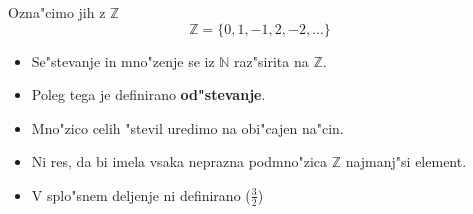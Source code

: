 Ozna"cimo jih z \(\mathbb{Z} \)
\[\mathbb{Z} = \{0, 1, -1, 2, -2, ...\} \]

\begin{itemize}
	\item Se"stevanje in mno"zenje se iz \(\mathbb{N} \) raz"sirita na \(\mathbb{Z} \). 
	\item Poleg tega je definirano \textbf{od"stevanje}.
	\item Mno"zico celih "stevil uredimo na obi"cajen na"cin.
	\item Ni res, da bi imela vsaka neprazna podmno"zica \(\mathbb{Z} \) najmanj"si element.
	\item V splo"snem deljenje ni definirano (\(\frac{3}{2} \))
\end{itemize}

